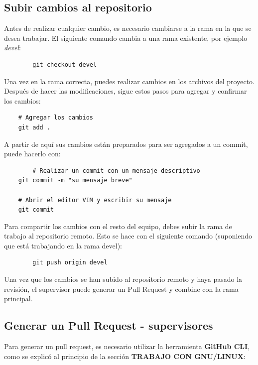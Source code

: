 \documentclass[a4paper]{article}
\begin{document}
\subsection{Subir cambios al repositorio}

Antes de realizar cualquier cambio, es necesario cambiarse a la rama en la que se desea trabajar. El siguiente comando cambia a una rama existente, por ejemplo \textit{devel}:

    \begin{lstlisting}
        git checkout devel
    \end{lstlisting}

Una vez en la rama correcta, puedes realizar cambios en los archivos del proyecto. Después de hacer las modificaciones, sigue estos pasos para agregar y confirmar los cambios:
\begin{lstlisting}
    # Agregar los cambios
    git add .
\end{lstlisting}
A partir de aquí sus cambios están preparados para ser agregados a un commit, puede hacerlo con:

\begin{lstlisting}
        # Realizar un commit con un mensaje descriptivo
    git commit -m "su mensaje breve"

    # Abrir el editor VIM y escribir su mensaje
    git commit
\end{lstlisting}

\newpage
\noindent
\thispagestyle{fancy}

Para compartir los cambios con el resto del equipo, debes subir la rama de trabajo al repositorio remoto. Esto se hace con el siguiente comando (suponiendo que está trabajando en la rama devel):

    \begin{lstlisting}
        git push origin devel
    \end{lstlisting}

Una vez que los cambios se han subido al repositorio remoto y haya pasado la revisión, el supervisor puede generar un Pull Request y combine con la rama principal. 

\subsection{Generar un Pull Request - supervisores}

\indent Para generar un pull request, es necesario utilizar la herramienta \textbf{GitHub CLI}, como se explicó al principio de la sección \textbf{TRABAJO CON GNU/LINUX}:
\end{document}
